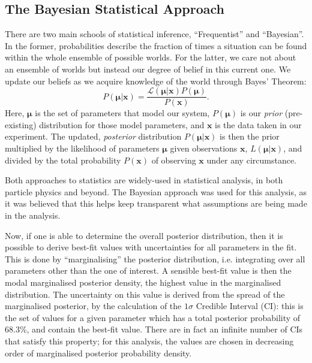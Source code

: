 \subsection{The Bayesian Statistical Approach}
There are two main schools of statistical inference, ``Frequentist'' and ``Bayesian''. In the former, probabilities describe the fraction of times a situation can be found within the whole ensemble of possible worlds. For the latter, we care not about an ensemble of worlds but instead our degree of belief in this current one. We update our beliefs as we acquire knowledge of the world through Bayes' Theorem:
\begin{equation}
    P\left(\bm{\mu}|\bm{x}\right) = \frac{\mathcal{L}\left(\bm{\mu}|\bm{x}\right)P\left(\bm{\mu}\right)}{P\left(\bm{x}\right)}.
\end{equation}
Here, $\bm{\mu}$ is the set of parameters that model our system, $P\left(\bm{\mu}\right)$ is our \textit{prior} (pre-existing) distribution for those model parameters, and $\bm{x}$ is the data taken in our experiment. The updated, \textit{posterior} distribution $P\left(\bm{\mu}|\bm{x}\right)$ is then the prior multiplied by the likelihood of parameters $\bm{\mu}$ given observations $\bm{x}$, $L\left(\bm{\mu}|\bm{x}\right)$, and divided by the total probability $P\left(\bm{x}\right)$ of observing $\bm{x}$ under any circumstance.

Both approaches to statistics are widely-used in statistical analysis, in both particle physics and beyond. The Bayesian approach was used for this analysis, as it was believed that this helps keep transparent what assumptions are being made in the analysis. 

Now, if one is able to determine the overall posterior distribution, then it is possible to derive best-fit values with uncertainties for all parameters in the fit. This is done by ``marginalising'' the posterior distribution, i.e. integrating over all parameters other than the one of interest. A sensible best-fit value is then the modal marginalised posterior density, the highest value in the marginalised distribution. The uncertainty on this value is derived from the spread of the marginalised posterior, by the calculation of the $1\sigma$ Credible Interval (CI): this is the set of values for a given parameter which has a total posterior probability of 68.3\%, and contain the best-fit value. There are in fact an infinite number of CIs that satisfy this property; for this analysis, the values are chosen in decreasing order of marginalised posterior probability density.
